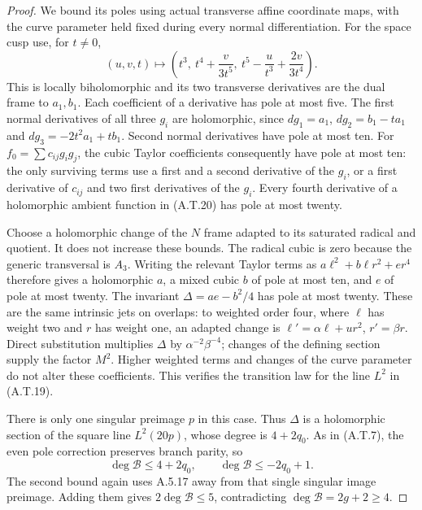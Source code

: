 \begin{proof}
We bound its poles using actual transverse affine
coordinate maps, with the curve parameter held
fixed during every normal differentiation. For the
space cusp use, for $t\ne0$,
\[
 (u,v,t)\longmapsto
 \left(t^3,\ t^4+\frac{v}{3t^5},\
                   t^5-\frac{u}{t^3}+\frac{2v}{3t^4}\right).
                                                        \tag{A.T.20}
\]
This is locally biholomorphic and its two transverse
derivatives are the dual frame to $a_1,b_1$.
Each coefficient of a derivative has pole at most
five. The first normal derivatives of all three
$g_i$ are holomorphic, since
$dg_1=a_1$, $dg_2=b_1-ta_1$ and
$dg_3=-2t^2a_1+t b_1$.
Second normal derivatives have pole at most ten.
For $f_0=\sum c_{ij}g_i g_j$, the cubic Taylor
coefficients consequently have pole at most ten:
the only surviving terms use a first and a second
derivative of the $g_i$, or a first derivative of
$c_{ij}$ and two first derivatives of the $g_i$.
Every fourth derivative of a holomorphic ambient
function in (A.T.20) has pole at most twenty.

Choose a holomorphic change of the $N$ frame adapted
to its saturated radical and quotient. It does not
increase these bounds. The radical cubic is zero
because the generic transversal is $A_3$.
Writing the relevant Taylor terms as
$a\ell^2+b\ell r^2+er^4$ therefore gives a
holomorphic $a$, a mixed cubic $b$ of pole at most
ten, and $e$ of pole at most twenty. The invariant
$\Delta=ae-b^2/4$ has pole at most twenty.
These are the same intrinsic jets on overlaps:
to weighted order four, where $\ell$ has weight
two and $r$ has weight one, an adapted change is
$\ell'=\alpha\ell+u r^2$, $r'=\beta r$.
Direct substitution multiplies $\Delta$ by
$\alpha^{-2}\beta^{-4}$; changes of the defining
section supply the factor $M^2$. Higher weighted
terms and changes of the curve parameter do not
alter these coefficients. This verifies the
transition law for the line $L^2$ in (A.T.19).

There is only one singular preimage $p$ in this case.
Thus $\Delta$ is a holomorphic section of the square
line $L^2(20p)$, whose degree is $4+2q_0$.
As in (A.T.7), the even pole correction preserves
branch parity, so
\[
 \deg\mathcal B\le4+2q_0,
 \qquad \deg\mathcal B\le-2q_0+1.
\]
The second bound again uses A.5.17 away from that
single singular image preimage. Adding them gives
$2\deg\mathcal B\le5$, contradicting
$\deg\mathcal B=2g+2\ge4$.


\end{proof}
